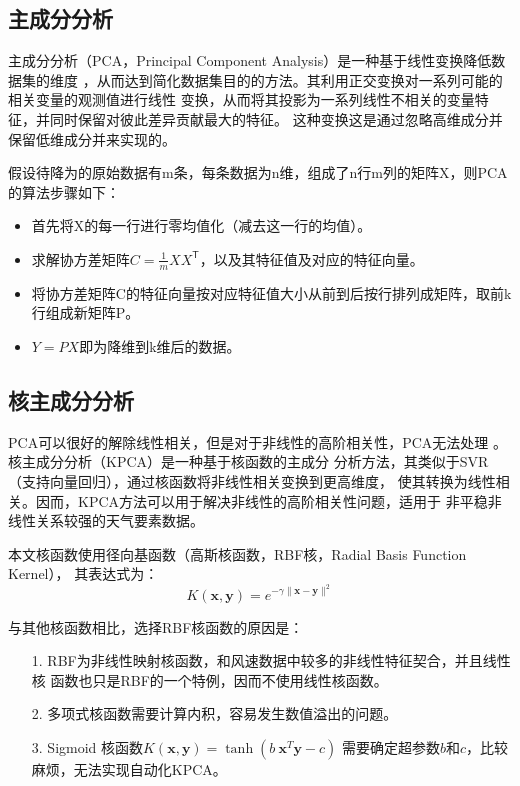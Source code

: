 \documentclass[AutoFakeBold]{LZUThesis}
\begin{document}
\subsection{主成分分析}
主成分分析（PCA，Principal Component Analysis）是一种基于线性变换降低数据集的维度
，从而达到简化数据集目的的方法。其利用正交变换对一系列可能的相关变量的观测值进行线性
变换，从而将其投影为一系列线性不相关的变量特征，并同时保留对彼此差异贡献最大的特征。
这种变换这是通过忽略高维成分并保留低维成分并来实现的。

假设待降为的原始数据有m条，每条数据为n维，组成了n行m列的矩阵X，则PCA的算法步骤如下：

\begin{itemize}
    \item 首先将X的每一行进行零均值化（减去这一行的均值）。
    \item 求解协方差矩阵$C=\frac{1}{m}XX^\mathsf{T}$，以及其特征值及对应的特征向量。
    \item 将协方差矩阵C的特征向量按对应特征值大小从前到后按行排列成矩阵，取前k行组成新矩阵P。
    \item $Y=PX$即为降维到k维后的数据。
\end{itemize}

\subsection{核主成分分析}
PCA可以很好的解除线性相关，但是对于非线性的高阶相关性，PCA无法处理
\cite{jolliffe2016principal}。核主成分分析（KPCA）是一种基于核函数的主成分
分析方法，其类似于SVR（支持向量回归），通过核函数将非线性相关变换到更高维度，
使其转换为线性相关。因而，KPCA方法可以用于解决非线性的高阶相关性问题，适用于
非平稳非线性关系较强的天气要素数据。

本文核函数使用径向基函数（高斯核函数，RBF核，Radial Basis Function Kernel），
其表达式为：
$$K(\mathbf x,\mathbf y)=e^{-\gamma\|\mathbf x-\mathbf y\|^2}$$

与其他核函数相比，选择RBF核函数的原因是：

\begin{itemize}
\item[1. ] RBF为非线性映射核函数，和风速数据中较多的非线性特征契合，并且线性核
函数也只是RBF的一个特例，因而不使用线性核函数。
\item[2. ] 多项式核函数需要计算内积，容易发生数值溢出的问题。
\item[3. ] Sigmoid 核函数$K(\mathbf x,\mathbf y)=\tanh(b\:\mathbf x^T\mathbf y-c)$
需要确定超参数$b$和$c$，比较麻烦，无法实现自动化KPCA。 
\end{itemize}
\end{document}
